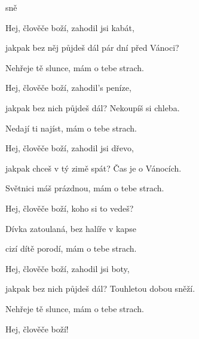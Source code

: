 

\zs
{}

 

  

  sně

 

  
\ks

\zs
Hej, člověče boží, zahodil jsi kabát,

jakpak bez něj půjdeš dál pár dní před Vánoci?

Nehřeje tě slunce, mám o tebe strach.
\ks

\zs
Hej, člověče boží, zahodil's peníze,

jakpak bez nich půjdeš dál? Nekoupíš si chleba.

Nedají ti najíst, mám o tebe strach.
\ks

\zs
Hej, člověče boží, zahodil jsi dřevo,

jakpak chceš v tý zimě spát? Čas je o Vánocích.

Světnici máš prázdnou, mám o tebe strach.
\ks

\zs
Hej, člověče boží, koho si to vedeš?

Dívka zatoulaná, bez halíře v kapse

cizí dítě porodí, mám o tebe strach.
\ks

\zs
Hej, člověče boží, zahodil jsi boty,

jakpak bez nich půjdeš dál? Touhletou dobou sněží.

Nehřeje tě slunce, mám o tebe strach.
\ks

Hej, člověče boží!

\kp
